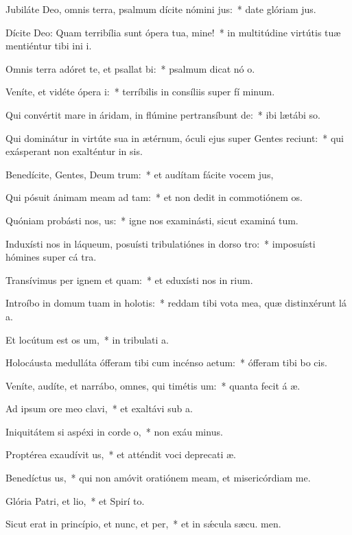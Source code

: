 \item Jubiláte Deo, omnis terra, psalmum dícite nómini jus:~* date glóriam  jus.
\item Dícite Deo: Quam terribília sunt ópera tua, mine!~* in multitúdine virtútis tuæ mentiéntur tibi ini i.
\item Omnis terra adóret te, et psallat bi:~* psalmum dicat nó o.
\item Veníte, et vidéte ópera i:~* terríbilis in consíliis super fí minum.
\item Qui convértit mare in áridam, in flúmine pertransíbunt de:~* ibi lætábi  so.
\item Qui dominátur in virtúte sua in ætérnum, óculi ejus super Gentes reciunt:~* qui exásperant non exalténtur in sis.
\item Benedícite, Gentes, Deum trum:~* et audítam fácite vocem  jus,
\item Qui pósuit ánimam meam ad tam:~* et non dedit in commotiónem  os.
\item Quóniam probásti nos, us:~* igne nos examinásti, sicut examiná tum.
\item Induxísti nos in láqueum, posuísti tribulatiónes in dorso tro:~* imposuísti hómines super cá tra.
\item Transívimus per ignem et quam:~* et eduxísti nos in rium.
\item Introíbo in domum tuam in holotis:~* reddam tibi vota mea, quæ distinxérunt lá a.
\item Et locútum est os um,~* in tribulati a.
\item Holocáusta medulláta ófferam tibi cum incénso aetum:~* ófferam tibi bo  cis.
\item Veníte, audíte, et narrábo, omnes, qui timétis um:~* quanta fecit á æ.
\item Ad ipsum ore meo clavi,~* et exaltávi sub  a.
\item Iniquitátem si aspéxi in corde o,~* non exáu minus.
\item Proptérea exaudívit us,~* et atténdit voci deprecati æ.
\item Benedíctus us,~* qui non amóvit oratiónem meam, et misericórdiam   me.
\item Glória Patri, et lio,~* et Spirí to.
\item Sicut erat in princípio, et nunc, et per,~* et in sǽcula sæcu. men.
